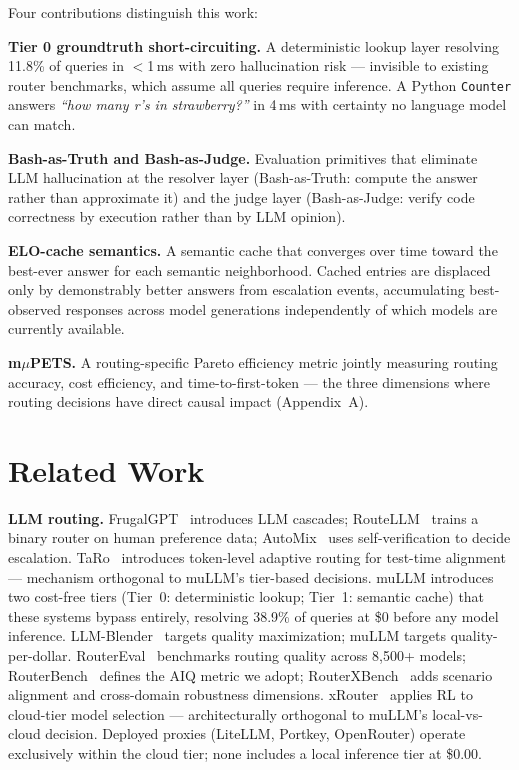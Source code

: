 \documentclass[11pt]{article}
\begin{document}
Four contributions distinguish this work:

\textbf{Tier 0 groundtruth short-circuiting.} A deterministic lookup
layer resolving 11.8\% of queries in $<$1\,ms with zero hallucination
risk --- invisible to existing router benchmarks, which assume all
queries require inference. A Python \texttt{Counter} answers
\textit{``how many r's in strawberry?''} in 4\,ms with certainty no
language model can match.

\textbf{Bash-as-Truth and Bash-as-Judge.} Evaluation primitives that
eliminate LLM hallucination at the resolver layer (Bash-as-Truth:
compute the answer rather than approximate it) and the judge layer
(Bash-as-Judge: verify code correctness by execution rather than by
LLM opinion).

\textbf{ELO-cache semantics.} A semantic cache that converges over time
toward the best-ever answer for each semantic neighborhood. Cached
entries are displaced only by demonstrably better answers from
escalation events, accumulating best-observed responses across model
generations independently of which models are currently available.

\textbf{m$\mu$PETS.} A routing-specific Pareto efficiency metric
jointly measuring routing accuracy, cost efficiency, and
time-to-first-token --- the three dimensions where routing decisions
have direct causal impact (Appendix~A).

\section{Related Work}

\textbf{LLM routing.}  FrugalGPT~\cite{chen2023frugalgpt} introduces
LLM cascades; RouteLLM~\cite{ong2024routellm} trains a binary router on
human preference data; AutoMix~\cite{madaan2023automix} uses
self-verification to decide escalation. TaRo~\cite{rai2025taro}
introduces token-level adaptive routing for test-time alignment ---
mechanism orthogonal to muLLM's tier-based decisions. muLLM introduces
two cost-free tiers (Tier~0: deterministic lookup; Tier~1: semantic
cache) that these systems bypass entirely, resolving 38.9\% of queries
at \$0 before any model inference. LLM-Blender~\cite{jiang2023llmblender}
targets quality maximization; muLLM targets quality-per-dollar.
RouterEval~\cite{huang2025routereval} benchmarks routing quality across
8,500+ models; RouterBench~\cite{withmartian2024routerbench} defines the
AIQ metric we adopt; RouterXBench~\cite{wu2026routerxbench} adds
scenario alignment and cross-domain robustness dimensions.
xRouter~\cite{salesforce2025xrouter} applies RL to cloud-tier model
selection --- architecturally orthogonal to muLLM's local-vs-cloud
decision. Deployed proxies (LiteLLM, Portkey, OpenRouter) operate
exclusively within the cloud tier; none includes a local inference tier
at \$0.00.
\end{document}
